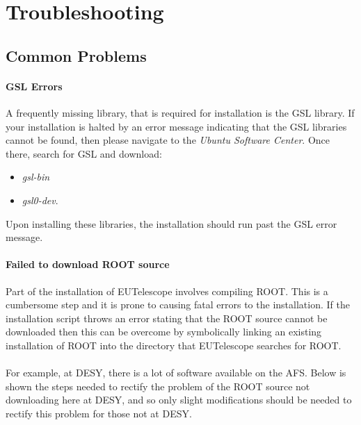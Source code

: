 \documentclass[11pt]{article}
\begin{document}
\section{Troubleshooting}
\subsection{Common Problems}
\paragraph{GSL Errors}
A frequently missing library, that is required for installation is the GSL library. If your installation is halted by an error message indicating that the GSL libraries cannot be found, then please navigate to the \textit{Ubuntu Software Center}. Once there, search for GSL and download:
\begin{itemize}
	\item \textit{gsl-bin}
    \item \textit{gsl0-dev}.
\end{itemize}
Upon installing these libraries, the installation should run past the GSL error message.
\paragraph{Failed to download ROOT source}
Part of the installation of EUTelescope involves compiling ROOT. This is a cumbersome step and it is prone to causing fatal errors to the installation. If the installation script throws an error stating that the ROOT source cannot be downloaded then this can be overcome by symbolically linking an existing installation of ROOT into the directory that EUTelescope searches for ROOT.
\paragraph{}
For example, at DESY, there is a lot of software available on the AFS. Below is shown the steps needed to rectify the problem of the ROOT source not downloading here at DESY, and so only slight modifications should be needed to rectify this problem for those not at DESY.
\end{document}

